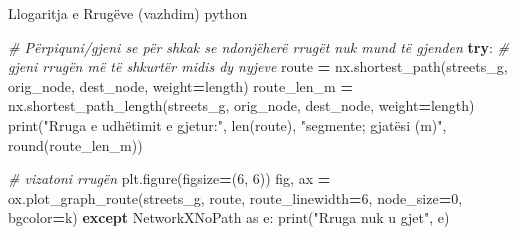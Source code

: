 \documentclass[
  ignorenonframetext,
]{beamer}
\newenvironment{Shaded}{\begin{snugshade}}{\end{snugshade}}
\newcommand{\BuiltInTok}[1]{#1}
\newcommand{\CommentTok}[1]{\textcolor[rgb]{0.56,0.35,0.01}{\textit{#1}}}
\newcommand{\ControlFlowTok}[1]{\textcolor[rgb]{0.13,0.29,0.53}{\textbf{#1}}}
\newcommand{\DecValTok}[1]{\textcolor[rgb]{0.00,0.00,0.81}{#1}}
\newcommand{\ImportTok}[1]{#1}
\newcommand{\NormalTok}[1]{#1}
\newcommand{\OperatorTok}[1]{\textcolor[rgb]{0.81,0.36,0.00}{\textbf{#1}}}
\newcommand{\StringTok}[1]{\textcolor[rgb]{0.31,0.60,0.02}{#1}}
\begin{document}
\begin{frame}[fragile]{Llogaritja e Rrugëve (vazhdim)}
\protect\hypertarget{llogaritja-e-rruguxebve-vazhdim}{}
python

\begin{Shaded}
\begin{Highlighting}[]
\CommentTok{\# Përpiquni/gjeni se për shkak se ndonjëherë rrugët nuk mund të gjenden}
\ControlFlowTok{try}\NormalTok{:}
    \CommentTok{\# gjeni rrugën më të shkurtër midis dy nyjeve}
\NormalTok{    route }\OperatorTok{=}\NormalTok{ nx.shortest\_path(streets\_g, orig\_node, dest\_node, weight}\OperatorTok{=}\StringTok{\textquotesingle{}length\textquotesingle{}}\NormalTok{)}
\NormalTok{    route\_len\_m }\OperatorTok{=}\NormalTok{ nx.shortest\_path\_length(streets\_g, orig\_node, dest\_node, weight}\OperatorTok{=}\StringTok{\textquotesingle{}length\textquotesingle{}}\NormalTok{)}
    \BuiltInTok{print}\NormalTok{(}\StringTok{"Rruga e udhëtimit e gjetur:"}\NormalTok{, }\BuiltInTok{len}\NormalTok{(route), }\StringTok{"segmente; gjatësi (m)"}\NormalTok{, }\BuiltInTok{round}\NormalTok{(route\_len\_m))}
    
    \CommentTok{\# vizatoni rrugën}
\NormalTok{    plt.figure(figsize}\OperatorTok{=}\NormalTok{(}\DecValTok{6}\NormalTok{, }\DecValTok{6}\NormalTok{))}
\NormalTok{    fig, ax }\OperatorTok{=}\NormalTok{ ox.plot\_graph\_route(streets\_g, route, route\_linewidth}\OperatorTok{=}\DecValTok{6}\NormalTok{, node\_size}\OperatorTok{=}\DecValTok{0}\NormalTok{, bgcolor}\OperatorTok{=}\StringTok{\textquotesingle{}k\textquotesingle{}}\NormalTok{)}
\ControlFlowTok{except}\NormalTok{ NetworkXNoPath }\ImportTok{as}\NormalTok{ e: }
    \BuiltInTok{print}\NormalTok{(}\StringTok{"Rruga nuk u gjet"}\NormalTok{, e)}
\end{Highlighting}
\end{Shaded}
\end{frame}
\end{document}
